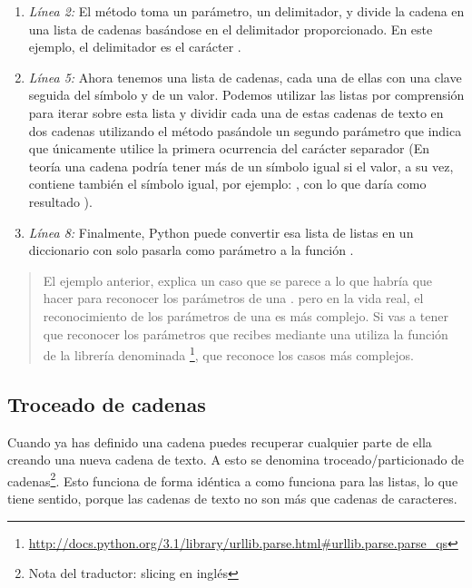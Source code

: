 \begin{enumerate}

\item \emph{Línea 2:} El método  toma un parámetro, un delimitador, y divide la cadena en una lista de cadenas basándose en el delimitador proporcionado. En este ejemplo, el delimitador es el carácter \codigo{\&}.

\item \emph{Línea 5:} Ahora tenemos una lista de cadenas, cada una de ellas con una clave seguida del símbolo \codigo{=} y de un valor. Podemos utilizar las listas por comprensión para iterar sobre esta lista y dividir cada una de estas cadenas de texto en dos cadenas utilizando el método  pasándole un segundo parámetro que indica que únicamente utilice la primera ocurrencia del carácter separador (En teoría una cadena podría tener más de un símbolo igual si el valor, a su vez, contiene también el símbolo igual, por ejemplo: , con lo que  daría como resultado ).

\item \emph{Línea 8:} Finalmente, Python puede convertir esa lista de listas en un diccionario con solo pasarla como parámetro a la función .

\end{enumerate}

\begin{quote}
El ejemplo anterior, explica un caso que se parece a lo que habría que hacer para reconocer los parámetros de una . pero en la vida real, el reconocimiento de los parámetros de una  es más complejo. Si vas a tener que reconocer los parámetros que recibes mediante una  utiliza la función de la librería  denominada \footnote{\href{http://docs.python.org/3.1/library/urllib.parse.html\#urllib.parse.parse\_qs}{http://docs.python.org/3.1/library/urllib.parse.html\#urllib.parse.parse\_qs}}, que reconoce los casos más complejos.
\end{quote}

\subsection{Troceado de cadenas}

Cuando ya has definido una cadena puedes recuperar cualquier parte de ella creando una nueva cadena de texto. A esto se denomina troceado/particionado de cadenas\footnote{Nota del traductor: slicing en inglés}. Esto funciona de forma idéntica a como funciona para las listas, lo que tiene sentido, porque las cadenas de texto no son más que cadenas de caracteres.

